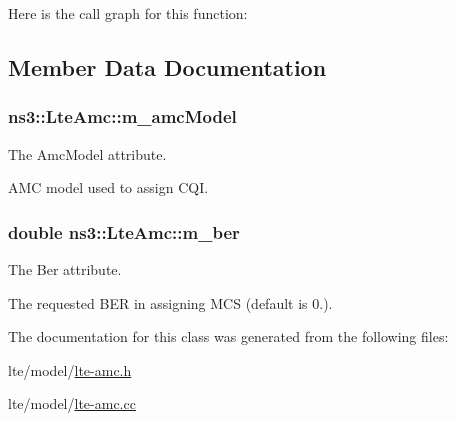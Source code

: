 Here is the call graph for this function\+:




\subsection{Member Data Documentation}
\subsubsection[{\texorpdfstring{m\+\_\+amc\+Model}{m_amcModel}}]{ ns3\+::\+Lte\+Amc\+::m\+\_\+amc\+Model\hspace{0.3cm}{\ttfamily [private]}}\hypertarget{classns3_1_1LteAmc_aadde02b027dcbeb1274befeccbdbc1da}{}\label{classns3_1_1LteAmc_aadde02b027dcbeb1274befeccbdbc1da}
The {\ttfamily Amc\+Model} attribute.

A\+MC model used to assign C\+QI. 
\subsubsection[{\texorpdfstring{m\+\_\+ber}{m_ber}}]{\setlength{\rightskip}{0pt plus 5cm}double ns3\+::\+Lte\+Amc\+::m\+\_\+ber\hspace{0.3cm}{\ttfamily [private]}}\hypertarget{classns3_1_1LteAmc_a85e7b0e6cd9ce70ef91a796033540362}{}\label{classns3_1_1LteAmc_a85e7b0e6cd9ce70ef91a796033540362}
The {\ttfamily Ber} attribute.

The requested B\+ER in assigning M\+CS (default is 0.). 

The documentation for this class was generated from the following files\+:\begin{DoxyCompactItemize}
\item 
lte/model/\hyperlink{lte-amc_8h}{lte-\/amc.\+h}\item 
lte/model/\hyperlink{lte-amc_8cc}{lte-\/amc.\+cc}\end{DoxyCompactItemize}
